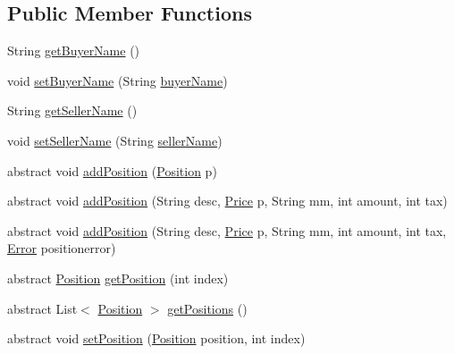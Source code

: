 \subsection*{Public Member Functions}
\begin{DoxyCompactItemize}
\item 
String \hyperlink{class_reduced_invoice_1_1_a_invoice_a0099d82cccbb09bc9240269c76c079d4}{get\+Buyer\+Name} ()
\item 
void \hyperlink{class_reduced_invoice_1_1_a_invoice_ab47710855319e2cf64a829d9bb37d243}{set\+Buyer\+Name} (String \hyperlink{class_reduced_invoice_1_1_a_invoice_ae75bdd20da8fa21dec01c2d032ac11c5}{buyer\+Name})
\item 
String \hyperlink{class_reduced_invoice_1_1_a_invoice_ac8973df8a999bc5556d697ed17c871f7}{get\+Seller\+Name} ()
\item 
void \hyperlink{class_reduced_invoice_1_1_a_invoice_a45129f98801ec280c52c2de35b48da0b}{set\+Seller\+Name} (String \hyperlink{class_reduced_invoice_1_1_a_invoice_ae00a97e1c74841fe0b0b43fccd1da24d}{seller\+Name})
\item 
abstract void \hyperlink{class_reduced_invoice_1_1_a_invoice_a29b30209d39ee91edee303ba5d36fd81}{add\+Position} (\hyperlink{class_reduced_invoice_1_1_position}{Position} p)
\item 
abstract void \hyperlink{class_reduced_invoice_1_1_a_invoice_ae126e009135936362d30c61ea7b20b52}{add\+Position} (String desc, \hyperlink{class_reduced_invoice_1_1_price}{Price} p, String mm, int amount, int tax)
\item 
abstract void \hyperlink{class_reduced_invoice_1_1_a_invoice_a0ccc4c6c378676635b552e12c6a7d690}{add\+Position} (String desc, \hyperlink{class_reduced_invoice_1_1_price}{Price} p, String mm, int amount, int tax, \hyperlink{enum_reduced_invoice_1_1_a_invoice_1_1_error}{Error} positionerror)
\item 
abstract \hyperlink{class_reduced_invoice_1_1_position}{Position} \hyperlink{class_reduced_invoice_1_1_a_invoice_a1264648436c734afc549b2d1adb20ff6}{get\+Position} (int index)
\item 
abstract List$<$ \hyperlink{class_reduced_invoice_1_1_position}{Position} $>$ \hyperlink{class_reduced_invoice_1_1_a_invoice_a62a407f4bec81c5dbd392f68ecff6582}{get\+Positions} ()
\item 
abstract void \hyperlink{class_reduced_invoice_1_1_a_invoice_a3abfa40d89bdc9f56daaf73adafcca5e}{set\+Position} (\hyperlink{class_reduced_invoice_1_1_position}{Position} position, int index)
\item 

\end{DoxyCompactItemize}
